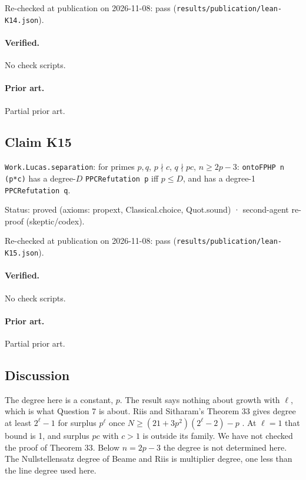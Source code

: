 \documentclass{article}
\begin{document}
Re-checked at publication on 2026-11-08: pass (\texttt{results/publication/lean-K14.json}).

\paragraph{Verified.}
No check scripts.

\paragraph{Prior art.} Partial prior art.

\subsection*{Claim K15}

\texttt{Work.Lucas.separation}: for primes $p,q$, $p\nmid c$, $q\nmid pc$, $n\ge2p-3$: \texttt{ontoFPHP n (p*c)} has a degree-$D$ \texttt{PPCRefutation p} iff $p\le D$, and has a degree-1 \texttt{PPCRefutation q}.

Status: proved (axioms: propext, Classical.choice, Quot.sound) · second-agent re-proof (skeptic/codex).

Re-checked at publication on 2026-11-08: pass (\texttt{results/publication/lean-K15.json}).

\paragraph{Verified.}
No check scripts.

\paragraph{Prior art.} Partial prior art.

\subsection*{Discussion}

The degree here is a constant, $p$. The result says nothing about growth with $\ell$, which is
what Question 7 is about. Riis and Sitharam's Theorem 33 gives degree at least $2^\ell-1$ for
surplus $p^\ell$ once $N\ge(21+3p^2)(2^\ell-2)-p$ \cite{riis1997nonconstant}. At $\ell=1$ that bound
is 1, and surplus $pc$ with $c>1$ is outside its family. We have not checked the proof of
Theorem 33. Below $n=2p-3$ the degree is not determined here. The Nullstellensatz degree of
Beame and Riis \cite{beame1998counting} is multiplier degree, one less than the line degree used here.
\end{document}
